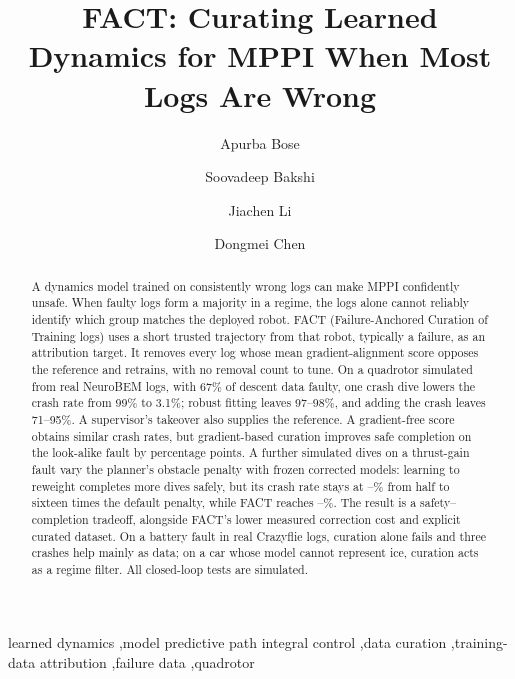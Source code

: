 \documentclass[preprint,12pt]{elsarticle}
\newcommand{\method}{FACT}
\begin{document}
\begin{frontmatter}

\title{\method: Curating Learned Dynamics for MPPI When Most Logs Are Wrong}

\author[ind]{Apurba Bose}
\author[ut]{Soovadeep Bakshi}
\author[ut]{Jiachen Li}
\author[ut]{Dongmei Chen}

\begin{abstract}
A dynamics model trained on consistently wrong logs can make MPPI confidently unsafe. When faulty logs form a majority in a regime, the logs alone cannot reliably identify which group matches the deployed robot. \method{} (Failure-Anchored Curation of Training logs) uses a short trusted trajectory from that robot, typically a failure, as an attribution target. It removes every log whose mean gradient-alignment score opposes the reference and retrains, with no removal count to tune. On a quadrotor simulated from real NeuroBEM logs, with 67\% of descent data faulty, one crash dive lowers the crash rate from 99\% to 3.1\%; robust fitting leaves 97--98\%, and adding the crash leaves 71--95\%. A supervisor's takeover also supplies the reference. A gradient-free score obtains similar crash rates, but gradient-based curation improves safe completion on the look-alike fault by \LookSafeGain{} percentage points. A further \CostDives{} simulated dives on a thrust-gain fault vary the planner's obstacle penalty with frozen corrected models: learning to reweight completes more dives safely, but its crash rate stays at \RWCrashMin--\RWCrashMax\% from half to sixteen times the default penalty, while \method{} reaches \FactCrashTwo--\FactCrashOne\%. The result is a safety--completion tradeoff, alongside \method{}'s lower measured correction cost and explicit curated dataset. On a battery fault in real Crazyflie logs, curation alone fails and three crashes help mainly as data; on a car whose model cannot represent ice, curation acts as a regime filter. All closed-loop tests are simulated.
\end{abstract}

\begin{keyword}
learned dynamics \sep model predictive path integral control \sep data curation \sep training-data attribution \sep failure data \sep quadrotor
\end{keyword}

\end{frontmatter}
\end{document}
